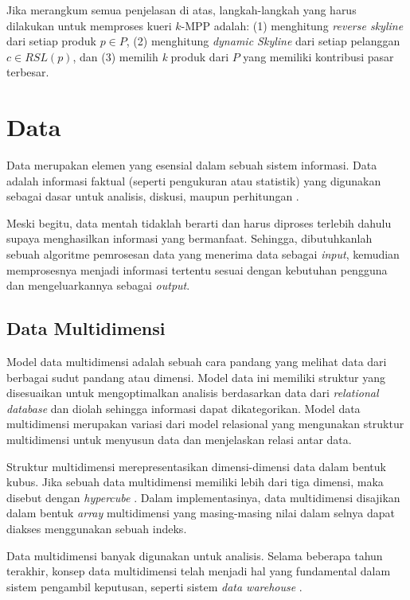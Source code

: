Jika merangkum semua penjelasan di atas, langkah-langkah yang harus dilakukan untuk memproses kueri $k$-MPP adalah: (1) menghitung \textit{reverse skyline} dari setiap produk $p \in P$, (2) menghitung \textit{dynamic Skyline} dari setiap pelanggan $c \in RSL(p)$, dan (3) memilih \textit{k} produk dari $P$ yang memiliki kontribusi pasar terbesar.

\section{Data}
\tab Data merupakan elemen yang esensial dalam sebuah sistem informasi. Data adalah informasi faktual (seperti pengukuran atau statistik) yang digunakan sebagai dasar untuk analisis, diskusi, maupun perhitungan \cite{data}. 

Meski begitu, data mentah tidaklah berarti dan harus diproses terlebih dahulu supaya menghasilkan informasi yang bermanfaat. Sehingga, dibutuhkanlah sebuah algoritme pemrosesan data yang menerima data sebagai \textit{input}, kemudian memprosesnya menjadi informasi tertentu sesuai dengan kebutuhan pengguna dan mengeluarkannya sebagai \textit{output}.

\subsection{Data Multidimensi}
\tab Model data multidimensi adalah sebuah cara pandang yang melihat data dari berbagai sudut pandang atau dimensi. Model data ini memiliki struktur yang disesuaikan untuk mengoptimalkan analisis berdasarkan data dari \textit{relational database} dan diolah sehingga informasi dapat dikategorikan. Model data multidimensi merupakan variasi dari model relasional yang mengunakan struktur multidimensi untuk menyusun data dan menjelaskan relasi antar data.

Struktur multidimensi merepresentasikan dimensi-dimensi data dalam bentuk kubus. Jika sebuah data multidimensi memiliki lebih dari tiga dimensi, maka disebut dengan \textit{hypercube} \cite{multidimensional-database}. Dalam implementasinya, data multidimensi disajikan dalam bentuk \textit{array} multidimensi yang masing-masing nilai dalam selnya dapat diakses menggunakan sebuah indeks.

Data multidimensi banyak digunakan untuk analisis. Selama beberapa tahun terakhir, konsep data multidimensi telah menjadi hal yang fundamental dalam sistem pengambil keputusan, seperti sistem \textit{data warehouse} \cite{multidimensional-database}.


